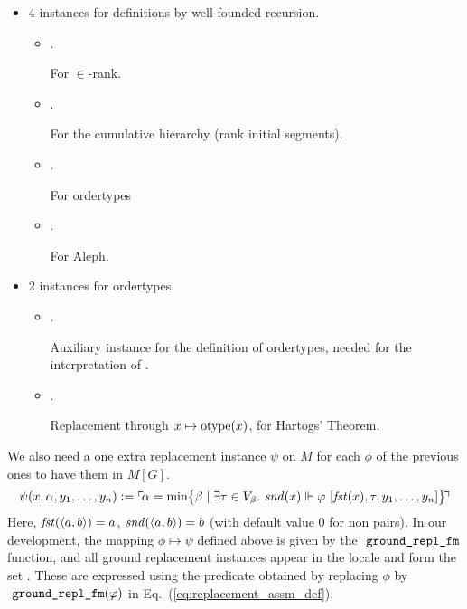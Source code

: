 \begin{itemize}
\item
  4 instances for definitions by well-founded recursion.
  \begin{itemize}
  \item {}.

    For $\in$-rank.
  \item {}.

    For the cumulative hierarchy (rank initial segments).
  \item {}.

    For ordertypes
  \item
    .

    For Aleph.
  \end{itemize}
\item
  2 instances for ordertypes.
  \begin{itemize}
  \item
    .

    Auxiliary instance for the definition of ordertypes, needed for
    the interpretation of .
  \item
    .

    Replacement through $x\mapsto \operatorname{otype}(x)$, for Hartogs' Theorem.
  \end{itemize}
\end{itemize}

We also need a one extra replacement instance $\psi$ on $M$ for each
$\phi$ of the
previous ones to have them in $M[G]$.
\[
  \psi(x,\alpha,y_1,\dots,y_n) \mathrel{\mathop:}= \ulcorner{\!\alpha = \min \bigl\{
    \beta \mid \exists\tau\in V_\beta.\  \mathit{snd}(x) \Vdash\varphi\ [\mathit{fst}(x),\tau,y_1,\dots,y_n]\bigr\}\!}\urcorner
\]
Here, $\mathit{fst}(\langle a,b\rangle) = a$, $\mathit{snd}(\langle a,b\rangle) = b$
(with default value $0$ for non pairs).
In our development, the mapping $\phi\mapsto\psi$ defined above is given by the
$\isatt{ground{\uscore}repl{\uscore}fm}$ function, and all ground replacement
instances appear in the locale  and form the set
. These are expressed using
the  predicate
obtained by replacing $\phi$ by
$\isatt{ground{\uscore}repl{\uscore}fm}(\phi)$ in Eq.~(\ref{eq:replacement_assm_def}).

